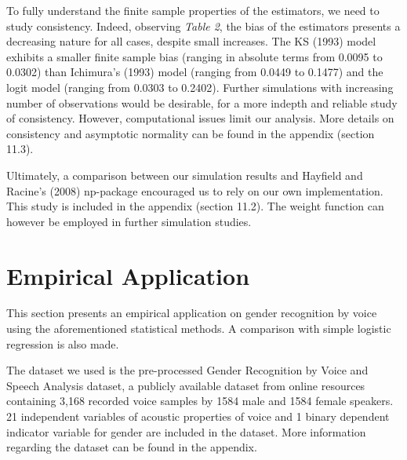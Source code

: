 \documentclass[a4paper]{article}
\begin{document}
\begin{table}[H]
\centering
{}
\caption {Bias of the estimators for different sample sizes} \label{tab:Bias of the estimators}
\end{table}
To fully understand the finite sample properties of the estimators, we need to study consistency. Indeed, observing \textit{Table 2}, the bias of the estimators presents a decreasing nature for all cases, despite small increases. The KS (1993) \cite{[12]} model exhibits a smaller finite sample bias (ranging in absolute terms from 0.0095 to 0.0302) than Ichimura's (1993) \citep{[6]} model (ranging from 0.0449 to 0.1477) and the logit model (ranging from 0.0303 to 0.2402). Further simulations with increasing number of observations would be desirable, for a more indepth and reliable study of consistency. However, computational issues limit our analysis. More details on consistency and asymptotic normality can be found in the appendix (section 11.3).

Ultimately, a comparison between our simulation results and Hayfield and Racine's (2008) np-package \cite{[28]} encouraged us to rely on our own implementation. This study is included in the appendix (section 11.2). The weight function can however be employed in further simulation studies. 

\section{Empirical Application} %
\label{sec:Empirical Application}

This section presents an empirical application on gender recognition by voice using the aforementioned statistical methods. A comparison with simple logistic regression is also made. 

The dataset we used is the pre-processed Gender Recognition by Voice and Speech Analysis dataset, a publicly available dataset from online resources containing 3,168 recorded voice samples by 1584 male and 1584 female speakers. 21 independent variables of acoustic properties of voice and 1 binary dependent indicator variable for gender are included in the dataset. More information regarding the dataset can be found in the appendix.  
\end{document}
